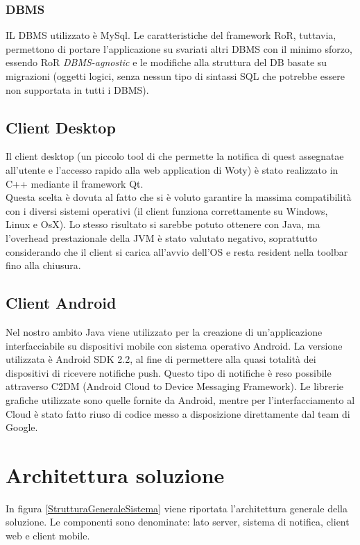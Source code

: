 \subsubsection{DBMS}
IL DBMS utilizzato è MySql. Le caratteristiche del framework RoR, tuttavia, permettono di portare l'applicazione su svariati altri DBMS con il minimo sforzo, essendo RoR \emph{DBMS-agnostic} e le modifiche alla struttura del DB basate su migrazioni (oggetti logici, senza nessun tipo di sintassi SQL che potrebbe essere non supportata in tutti i DBMS).

\subsection{Client Desktop}
Il client desktop (un piccolo tool di che permette la notifica di quest assegnatae all'utente e l'accesso rapido alla web application di Woty) è stato realizzato in C++ mediante il framework Qt.\\
Questa scelta è dovuta al fatto che si è voluto garantire la massima compatibilità con i diversi sistemi operativi (il client funziona correttamente su Windows, Linux e OsX). Lo stesso risultato si sarebbe potuto ottenere con Java, ma l'overhead prestazionale della JVM è stato valutato negativo, soprattutto considerando che il client si carica all'avvio dell'OS e resta resident nella toolbar fino alla chiusura. 

\subsection{Client Android}
Nel nostro ambito Java viene utilizzato per la creazione di un'applicazione interfacciabile su dispositivi mobile con sistema operativo Android. La versione utilizzata è Android SDK 2.2, al fine di permettere alla quasi totalità dei dispositivi di ricevere notifiche push. Questo tipo di notifiche è reso possibile attraverso C2DM (Android Cloud to Device Messaging Framework). Le librerie grafiche utilizzate sono quelle fornite da Android, mentre per l'interfacciamento al Cloud è stato fatto riuso di codice messo a disposizione direttamente dal team di Google. 


\section{Architettura soluzione}

In figura \ref{StrutturaGeneraleSistema} viene riportata l'architettura generale della soluzione. Le componenti sono denominate: lato server, sistema di notifica, client web e client mobile. 

